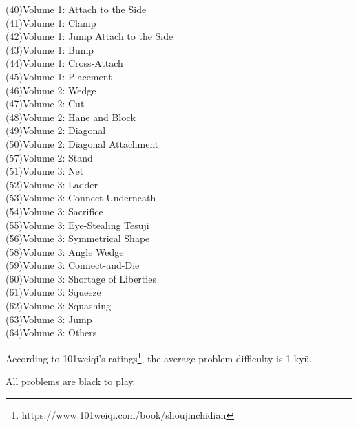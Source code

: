 (40)\:\:Volume 1: Attach to the Side\\
(41)\:\:Volume 1: Clamp\\
(42)\:\:Volume 1: Jump Attach to the Side\\
(43)\:\:Volume 1: Bump\\
(44)\:\:Volume 1: Cross-Attach\\
(45)\:\:Volume 1: Placement\\
(46)\:\:Volume 2: Wedge\\
(47)\:\:Volume 2: Cut\\
(48)\:\:Volume 2: Hane and Block\\
(49)\:\:Volume 2: Diagonal\\
(50)\:\:Volume 2: Diagonal Attachment\\
(57)\:\:Volume 2: Stand\\
(51)\:\:Volume 3: Net\\
(52)\:\:Volume 3: Ladder\\
(53)\:\:Volume 3: Connect Underneath\\
(54)\:\:Volume 3: Sacrifice\\
(55)\:\:Volume 3: Eye-Stealing Tesuji\\
(56)\:\:Volume 3: Symmetrical Shape\\
(58)\:\:Volume 3: Angle Wedge\\
(59)\:\:Volume 3: Connect-and-Die\\
(60)\:\:Volume 3: Shortage of Liberties\\
(61)\:\:Volume 3: Squeeze\\
(62)\:\:Volume 3: Squashing\\
(63)\:\:Volume 3: Jump\\
(64)\:\:Volume 3: Others

According to 101weiqi's ratings\footnote{https://www.101weiqi.com/book/shoujinchidian}, the average problem difficulty is 1 ky\=u.

All problems are black to play.

\hspace{-3pt}%
\renderproblems
\rendersolutions


